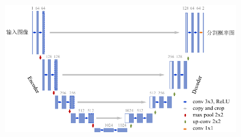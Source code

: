 \begin{figure}[!ht]
    \centering
    \includegraphics[width=0.9\textwidth]{figure/basic_theory/unet_arch}
    \label{fig:basic_unet_arch}
\end{figure}

